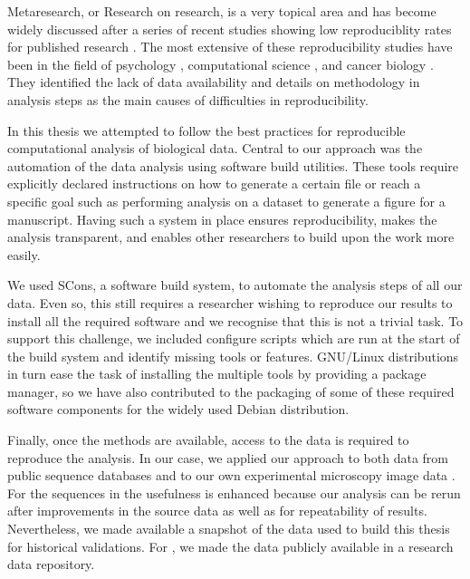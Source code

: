 
Metaresearch, or Research on research,
is a very topical area and has become widely
discussed after a series of recent
studies showing low reproduciblity rates for
published research \citep{ioannidis2015meta}.  The
most extensive of these reproducibility studies have been in the field of
psychology \citep{open2015estimating},
computational science \citep{collberg2016repeatability},
and cancer biology \citep{prinz2011believe, ioannidis2009repeatability}.
They identified the lack of data availability
and details on methodology in analysis steps as
the main causes of difficulties in reproducibility.

In this thesis we attempted to follow the best practices for
reproducible computational analysis of biological data.
Central to our approach was the automation of the data analysis using
software build utilities.  These tools require explicitly declared
instructions on how to generate a certain file or reach a specific
goal such as performing analysis on a dataset to generate a
figure for a manuscript.  Having such a system in place ensures
reproducibility, makes the analysis transparent, and enables
other researchers to build upon the work more easily.

We used SCons, a software build system, to automate the analysis
steps of all our data.
Even so,
this still requires a researcher wishing to reproduce
our results to install all the required software and we recognise that
this is not a
trivial task.  To support this challenge, we included
configure scripts which are run at the start of the build system and
identify missing tools or features.
GNU/Linux distributions in turn ease
the task of installing the multiple tools by providing a
package manager, so we have also contributed to the packaging of
some of these required software components for the
widely used Debian distribution.

Finally, once the methods are available, access to the
data is required to reproduce the analysis.  In our case, we applied
our approach to both data from public sequence
databases  and to our own experimental
microscopy image data .  For
the sequences in  the usefulness is
enhanced because our analysis can be rerun after improvements in the
source data as well as for repeatability of results.
Nevertheless, we made available a
snapshot of the data used to build this thesis
for historical validations.
For , we made the
data publicly available in a research data repository.

